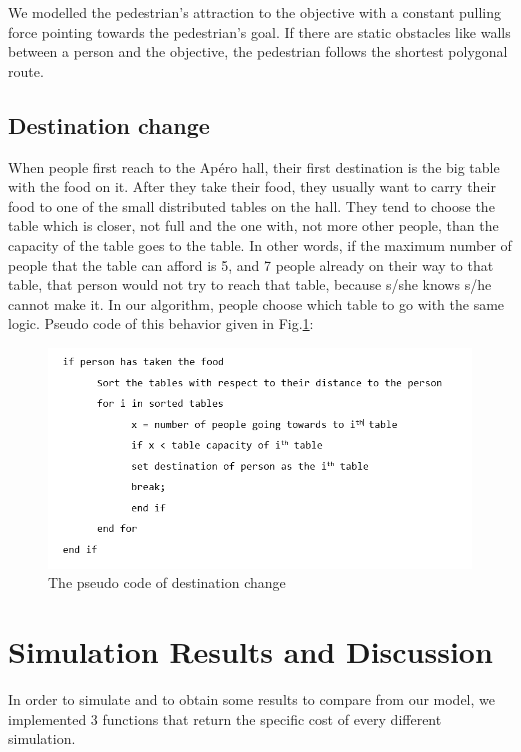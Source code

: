 \documentclass[11pt]{article}
\begin{document}
We modelled the pedestrian's attraction to the objective with a constant pulling force pointing towards the pedestrian's goal. If there are static obstacles like walls between a person and the objective, the pedestrian follows the shortest polygonal route.

\subsection{Destination change}
When people first reach to the Apéro hall, their first destination is the big table with the food on it. After they take their food, they usually want to carry their food to one of the small distributed tables on the hall. They tend to choose the table which is closer, not full and the one with, not more other people, than the capacity of the table goes to the table. In other words, if the maximum number of people that the table can afford is 5, and 7 people already on their way to that table, that person would not try to reach that table, because s/she knows s/he cannot make it. In our algorithm, people choose which table to go with the same logic. Pseudo code of this behavior given in Fig.\ref{fig:sudocode}:

\begin{figure}[H]
\centering
\includegraphics[scale=0.7]{sudocode.png}
\caption{The pseudo code of destination change}
\label{fig:sudocode}
\end{figure}

\section{Simulation Results and Discussion}
In order to simulate and to obtain some results to compare from our model, we implemented 3 functions that return the specific cost of every different simulation.
\end{document}
